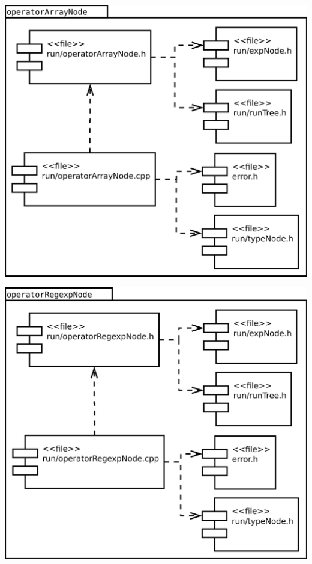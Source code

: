 \begin{multicols}{2}
\begin{center}
\includegraphics[scale=0.3]{files_arquitecture/operatorArrayNode.png} \\
\end{center}
\begin{center}
\includegraphics[scale=0.3]{files_arquitecture/operatorRegexpNode.png} \\
\end{center}
\end{multicols}

